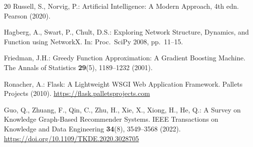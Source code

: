 \documentclass[runningheads]{llncs}
\begin{document}
\begin{thebibliography}{20}
Russell, S., Norvig, P.:
Artificial Intelligence: A Modern Approach, 4th edn.
Pearson (2020).

Hagberg, A., Swart, P., Chult, D.S.:
Exploring Network Structure, Dynamics, and Function using NetworkX.
In: Proc.\ SciPy 2008, pp.\ 11--15.

Friedman, J.H.:
Greedy Function Approximation: A Gradient Boosting Machine.
The Annals of Statistics \textbf{29}(5), 1189--1232 (2001).

Ronacher, A.:
Flask: A Lightweight WSGI Web Application Framework.
Pallets Projects (2010). \url{https://flask.palletsprojects.com}

Guo, Q., Zhuang, F., Qin, C., Zhu, H., Xie, X., Xiong, H., He, Q.:
A Survey on Knowledge Graph-Based Recommender Systems.
IEEE Transactions on Knowledge and Data Engineering \textbf{34}(8), 3549--3568 (2022).
\url{https://doi.org/10.1109/TKDE.2020.3028705}

\end{thebibliography}
\end{document}
